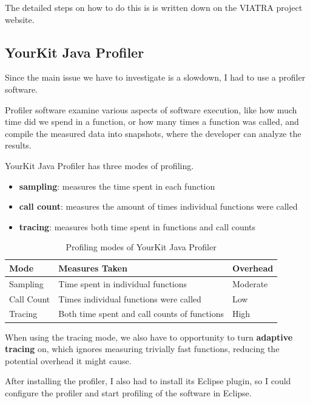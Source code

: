 \documentclass[11pt,a4paper,oneside]{report}
\begin{document}
The detailed steps on how to do this is is written down on the VIATRA project
website\cite{ujhelyi_harmath_david_nagy_hegedus_2019}.

\subsection{YourKit Java Profiler}
Since the main issue we have to investigate is a slowdown, I had to use a
profiler software.

Profiler software examine various aspects of software execution, like how much
time did we spend in a function, or how many times a function was called, and
compile the measured data into snapshots, where the developer can analyze the
results.

YourKit Java Profiler has three modes of profiling.
\begin{itemize}
    \item{\textbf{sampling}: measures the time spent in each function}
    \item{\textbf{call count}: measures the amount of times individual functions were called}
    \item{\textbf{tracing}: measures both time spent in functions and call counts}
\end{itemize}

\begin{table}[ht]
    \footnotesize
    \centering
    \begin{tabular}{ l l l }
        \toprule
        Mode & Measures Taken & Overhead \\
        \midrule
        Sampling & Time spent in individual functions & Moderate \\
        Call Count & Times individual functions were called & Low \\
        Tracing & Both time spent and call counts of functions & High \\
        \bottomrule
    \end{tabular}
    \caption{Profiling modes of YourKit Java Profiler}
    \label{tab:profiler-modes}
\end{table}

When using the tracing mode, we also have to opportunity to turn
\textbf{adaptive tracing} on, which ignores measuring trivially fast functions,
reducing the potential overhead it might cause.

After installing the profiler, I also had to install its Eclipse plugin, so I
could configure the profiler and start profiling of the software in Eclipse.
\end{document}
